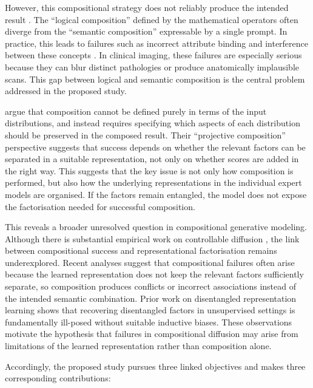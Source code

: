 However, this compositional strategy does not reliably produce the intended result \citep{t2i_compbench_2025,mechanisms2025projective,du2024compositional}. 
The ``logical composition'' defined by the mathematical operators often diverge from the ``semantic composition'' expressable by a single prompt. 
In practice, this leads to failures such as incorrect attribute binding and interference between these concepts \citep{t2i_compbench_2025}. 
In clinical imaging, these failures are especially serious because they can blur distinct pathologies or produce anatomically implausible scans. 
This gap between logical and semantic composition is the central problem addressed in the proposed study.

\citet{mechanisms2025projective} argue that composition cannot be defined purely in terms of the input distributions, and instead requires specifying which aspects of each distribution should be preserved in the composed result. 
Their ``projective composition'' perspective suggests
that success depends on whether the relevant factors can be separated in a suitable
representation, not only on whether scores are added in the right way. 
This suggests that the key issue is not only how composition is performed, but also how the underlying representations in the individual expert models are organised.
If the factors remain entangled, the model does not expose the factorisation needed for successful composition.

This reveals a broader unresolved question in compositional generative modeling. 
Although there is substantial empirical work on controllable diffusion \citep{wu2024ifadapter, xing2024csgo}, the link between compositional success and representational factorisation remains underexplored. 
Recent analyses \citep{mechanisms2025projective, du2024compositional, t2i_compbench_2025} suggest that compositional failures often arise because the learned representation does not keep the relevant factors sufficiently separate, so composition produces conflicts or incorrect associations instead of the intended semantic combination.
Prior work on disentangled representation learning \citep{challeau2019challenging, traeuble2021disentangled} shows that recovering disentangled factors in unsupervised settings is fundamentally ill-posed without suitable inductive biases.
These observations motivate the hypothesis that failures in compositional diffusion may arise from limitations of the learned representation rather than composition alone.

Accordingly, the proposed study pursues three linked objectives and makes three corresponding contributions:

